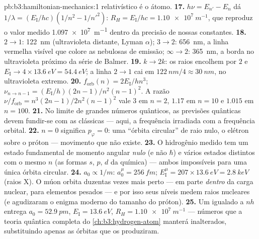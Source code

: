 \begin{solution}{pb:b3:hamiltonian-mechanics:1}
relativístico é o átomo.
\textbf{17.} $h\nu = E_{n'} - E_n$ dá $1/\lambda =
(E_{\text{I}}/hc)(1/n^2 - 1/n'^2)$: $R_H = E_{\text{I}}/hc =
\qty{1.10e7}{m^{-1}}$, que reproduz o valor medido
\qty{1.097e7}{m^{-1}} dentro da precisão de nossas constantes.
\textbf{18.} $2 \to 1$: \qty{122}{nm} (ultravioleta distante, Lyman
$\alpha$); $3 \to 2$: \qty{656}{nm}, a linha vermelha visível que
colore as nebulosas de emissão; $\infty \to 2$: \qty{365}{nm}, a borda
no ultravioleta próximo da série de Balmer.
\textbf{19.} $k \to 2k$: os raios encolhem por $2$ e $E_{\text{I}} \to
4 \times \qty{13.6}{eV} = \qty{54.4}{eV}$; a linha $2 \to 1$ cai em
$\qty{122}{nm}/4 \approx \qty{30}{nm}$, no ultravioleta extremo.
\textbf{20.} $f_{\text{orb}}(n) = 2E_{\text{I}}/hn^3$;
$\nu_{n \to n-1} = (E_{\text{I}}/h)(2n - 1)/n^2(n-1)^2$. A razão
$\nu/f_{\text{orb}} = n^3(2n-1)/2n^2(n-1)^2$ vale $3$ em $n = 2$,
$1.17$ em $n = 10$ e $1.015$ em $n = 100$.
\textbf{21.} No limite de grandes números quânticos, as previsões
quânticas devem fundir-se com as clássicas --- aqui, a frequência
irradiada com a frequência orbital.
\textbf{22.} $n = 0$ significa $p_\varphi = 0$: uma ``órbita
circular'' de raio nulo, o elétron sobre o próton --- movimento que
não existe.
\textbf{23.} O hidrogênio medido tem um estado fundamental de momento
angular \emph{nulo} (e não $\hbar$) e vários estados distintos com o
mesmo $n$ (as formas $s$, $p$, $d$ da química) --- ambos impossíveis
para uma única órbita circular.
\textbf{24.} $a_0 \propto 1/m$: $a_0^\mu = \qty{256}{fm}$;
$E_{\text{I}}^\mu = 207 \times \qty{13.6}{eV} = \qty{2.8}{keV}$
(raios X). O múon orbita duzentas vezes mais perto --- em parte
\emph{dentro} da carga nuclear, para elementos pesados --- e por isso
seus níveis medem raios nucleares (e agudizaram o enigma moderno do
tamanho do próton).
\textbf{25.} Um  igualado a $nh$ entrega $a_0 =
\qty{52.9}{pm}$, $E_{\text{I}} = \qty{13.6}{eV}$, $R_H =
\qty{1.10e7}{m^{-1}}$ --- números que a teoria quântica completa do
\cref{ch:b3:hydrogen-atom} manterá inalterados, substituindo apenas as
órbitas que os produziram.
\end{solution}
